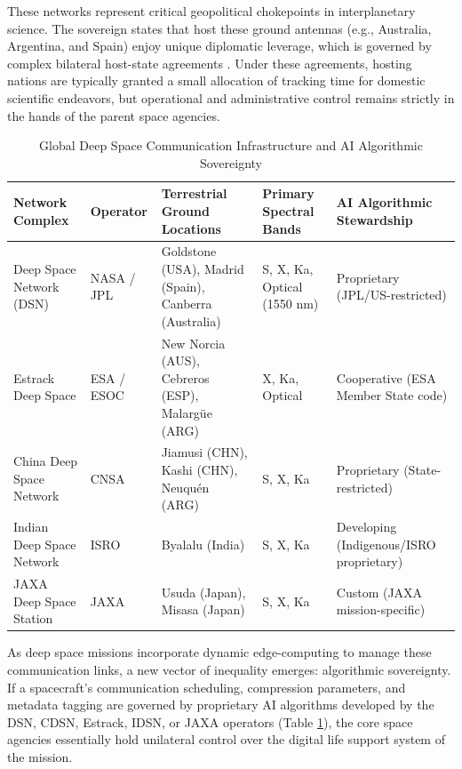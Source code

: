 \documentclass[final,5p,times,twocolumn]{elsarticle}
\begin{document}
These networks represent critical geopolitical chokepoints in interplanetary science. The sovereign states that host these ground antennas (e.g., Australia, Argentina, and Spain) enjoy unique diplomatic leverage, which is governed by complex bilateral host-state agreements \citep{lyall2018space}. Under these agreements, hosting nations are typically granted a small allocation of tracking time for domestic scientific endeavors, but operational and administrative control remains strictly in the hands of the parent space agencies.

\begin{table}[t]
\centering
\caption{Global Deep Space Communication Infrastructure and AI Algorithmic Sovereignty}
\label{tab:infrastructure}
\begin{tabular}{p{2.5cm}p{1.2cm}p{4.2cm}p{2.2cm}p{3.9cm}}
\toprule
\textbf{Network Complex} & \textbf{Operator} & \textbf{Terrestrial Ground Locations} & \textbf{Primary Spectral Bands} & \textbf{AI Algorithmic Stewardship} \\
\midrule
Deep Space Network (DSN) & NASA / JPL & Goldstone (USA), Madrid (Spain), Canberra (Australia) & S, X, Ka, Optical (1550 nm) & Proprietary (JPL/US-restricted) \\
Estrack Deep Space       & ESA / ESOC & New Norcia (AUS), Cebreros (ESP), Malargüe (ARG)      & X, Ka, Optical                & Cooperative (ESA Member State code) \\
China Deep Space Network & CNSA       & Jiamusi (CHN), Kashi (CHN), Neuquén (ARG)             & S, X, Ka                      & Proprietary (State-restricted) \\
Indian Deep Space Network & ISRO       & Byalalu (India)                                       & S, X, Ka                      & Developing (Indigenous/ISRO proprietary) \\
JAXA Deep Space Station  & JAXA       & Usuda (Japan), Misasa (Japan)                         & S, X, Ka                      & Custom (JAXA mission-specific) \\
\bottomrule
\end{tabular}
\end{table}

As deep space missions incorporate dynamic edge-computing to manage these communication links, a new vector of inequality emerges: algorithmic sovereignty. If a spacecraft's communication scheduling, compression parameters, and metadata tagging are governed by proprietary AI algorithms developed by the DSN, CDSN, Estrack, IDSN, or JAXA operators (Table \ref{tab:infrastructure}), the core space agencies essentially hold unilateral control over the digital life support system of the mission.
\end{document}
